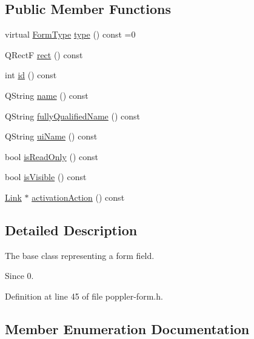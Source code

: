 \subsection*{Public Member Functions}
\begin{DoxyCompactItemize}
\item 
virtual \hyperlink{class_poppler_1_1_form_field_af9b28bf05b29780f81445b21a0ed7423}{Form\+Type} \hyperlink{class_poppler_1_1_form_field_aec536e2f0468aedcc6b6d7df034442b2}{type} () const =0
\item 
Q\+RectF \hyperlink{class_poppler_1_1_form_field_ae5922abdb6e6fbae7b147a5f1e39712e}{rect} () const
\item 
int \hyperlink{class_poppler_1_1_form_field_a2ed85b3b8cb5258c06a924e11316a290}{id} () const
\item 
Q\+String \hyperlink{class_poppler_1_1_form_field_afcd3893ef723edb63aa90eb4e514b7c8}{name} () const
\item 
Q\+String \hyperlink{class_poppler_1_1_form_field_a739db6a4f58196776f7e83adbf3453b1}{fully\+Qualified\+Name} () const
\item 
Q\+String \hyperlink{class_poppler_1_1_form_field_a76ec302a35ca98ed9c085cb007912d0b}{ui\+Name} () const
\item 
bool \hyperlink{class_poppler_1_1_form_field_a03fcab88eb5e93cec0b64c086219b8de}{is\+Read\+Only} () const
\item 
bool \hyperlink{class_poppler_1_1_form_field_ac6b13fb33bab5a7fe11df56fdf607c87}{is\+Visible} () const
\item 
\hyperlink{class_poppler_1_1_link}{Link} $\ast$ \hyperlink{class_poppler_1_1_form_field_a3dc454f126c810978473d655686c214a}{activation\+Action} () const
\end{DoxyCompactItemize}


\subsection{Detailed Description}
The base class representing a form field.

\begin{DoxySince}{Since}
0. 
\end{DoxySince}


Definition at line 45 of file poppler-\/form.\+h.



\subsection{Member Enumeration Documentation}
\mbox{\label{class_poppler_1_1_form_field_af9b28bf05b29780f81445b21a0ed7423}} 

